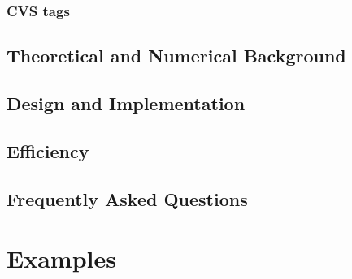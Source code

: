 \documentclass[letterpaper,twoside,openright,10pt]{memoir}
\begin{document}



\section{CVS tags}
\label{sec:CVS}




\chapter{Theoretical and Numerical Background}
\label{chap:Numerics}





\chapter{Design and Implementation}
\label{chap:Design}





\chapter{Efficiency}
\label{chap:Efficiency}




\chapter{Frequently Asked Questions}
\label{chap:FAQ}




% 
% 
% 



\sloppy

\part{Examples}
\label{part:Examples}
\end{document}
